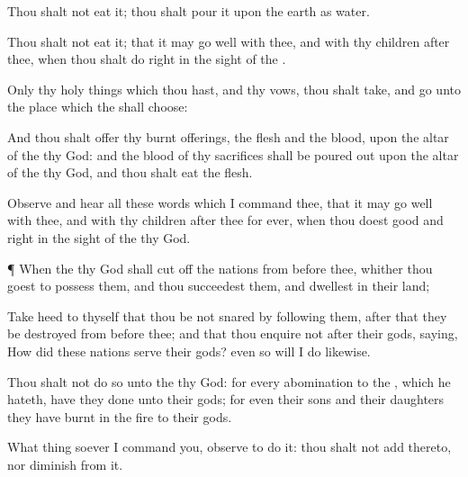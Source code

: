 {Thou shalt not
eat it; thou shalt
pour it upon the
earth as
water.

Thou shalt not
eat it; that it may go
well with thee, and with thy
children
after thee, when thou shalt
do
{}
right in the
sight of the
{}.

Only thy holy
things which thou hast, and thy
vows, thou shalt
take, and
go unto the
place which the
{} shall
choose:

And thou shalt
offer thy burnt
offerings, the
flesh and the
blood, upon the
altar of the
{} thy
God: and the
blood of thy
sacrifices shall be poured
out upon the
altar of the
{} thy
God, and thou shalt
eat the
flesh.

Observe and
hear all these
words which I
command thee, that it may go
well with thee, and with thy
children
after thee
for
ever, when thou
doest
{}
good and
right in the
sight of the
{} thy
God.


\par }{\PP {}¶ When the
{} thy
God shall cut
off the
nations from
before thee, whither thou
goest to
possess them, and thou
succeedest them, and
dwellest in their
land;

Take
heed to thyself that thou be not
snared by
following them,
after that they be
destroyed from
before thee; and that thou
enquire not after their
gods,
saying, How did these
nations
serve their
gods? even so will I
do
likewise.

Thou shalt not
do so unto the
{} thy
God: for every
abomination to the
{}, which he
hateth, have they
done unto their
gods; for even their
sons and their
daughters they have
burnt in the
fire to their
gods.

What
thing soever I
command you,
observe to
do it: thou shalt not
add thereto, nor
diminish from it.




\par }

